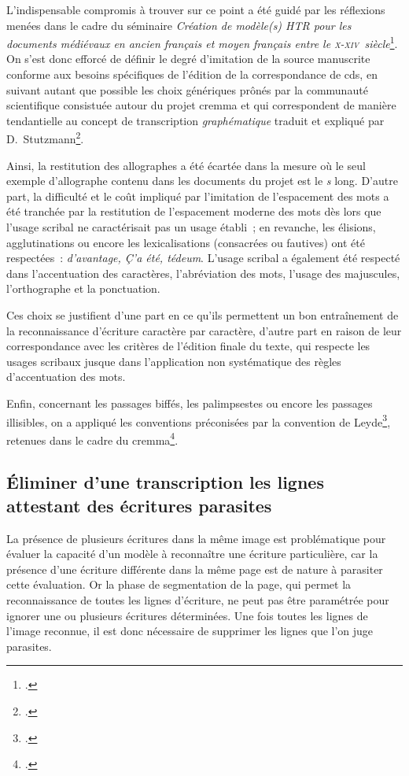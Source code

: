 \documentclass[a4paper,12pt,twoside]{book}
\newcommand{\siecle}[1]{\textsc{#1}\ieme}
\begin{document}
				L'indispensable compromis à trouver sur ce point a été guidé par les réflexions menées dans le cadre du séminaire \textit{Création de modèle(s) HTR pour les documents médiévaux en ancien français et moyen français entre le \siecle{x}-\siecle{xiv}~siècle}\footcite{pincheSeminaireCreationModele2021b}. On s'est donc efforcé de définir le degré d'imitation de la source manuscrite conforme aux besoins spécifiques de l'édition de la correspondance de \gls{cds}, en suivant autant que possible les choix génériques prônés par la communauté scientifique consistuée autour du projet \gls{cremma} et qui correspondent de manière tendantielle au concept de transcription \textit{graphématique} traduit et expliqué par D.~Stutzmann\footcite[p.~251]{stutzmannPaleographieStatistiquePour2011a}.
				
				Ainsi, la restitution des allographes a été écartée dans la mesure où le seul exemple d'allographe contenu dans les documents du projet est le \textit{s} long. D'autre part, la difficulté et le coût impliqué par l'imitation de l'espacement des mots a été tranchée par la restitution de l'espacement moderne des mots dès lors que l'usage scribal ne caractérisait pas un usage établi~; en revanche, les élisions, agglutinations ou encore les lexicalisations (consacrées ou fautives) ont été respectées~: \textit{d'avantage, Ç'a été, tédeum}. L'usage scribal a également été respecté dans l'accentuation des caractères, l'abréviation des mots, l'usage des majuscules, l'orthographe et la ponctuation.
				
				Ces choix se justifient d'une part en ce qu'ils permettent un bon entraînement de la reconnaissance d'écriture caractère par caractère, d'autre part en raison de leur correspondance avec les critères de l'édition finale du texte, qui respecte les usages scribaux jusque dans l'application non systématique des règles d'accentuation des mots.
				
				Enfin, concernant les passages biffés, les palimpsestes ou encore les passages illisibles, on a appliqué les conventions préconisées par la convention de Leyde\footcite{leidenConvention}, retenues dans le cadre du \gls{cremma}\footcite{pincheSeminaireCreationModele2021a}.
				
			\subsection{Éliminer d'une transcription les lignes attestant des écritures parasites}
				La présence de plusieurs écritures dans la même image est problématique pour évaluer la capacité d'un modèle à reconnaître une écriture particulière, car la présence d'une écriture différente dans la même page est de nature à parasiter cette évaluation. Or la phase de segmentation de la page, qui permet la reconnaissance de toutes les lignes d'écriture, ne peut pas être paramétrée pour ignorer une ou plusieurs écritures déterminées. Une fois toutes les lignes de l'image reconnue, il est donc nécessaire de supprimer les lignes que l'on juge parasites.
				
\end{document}

